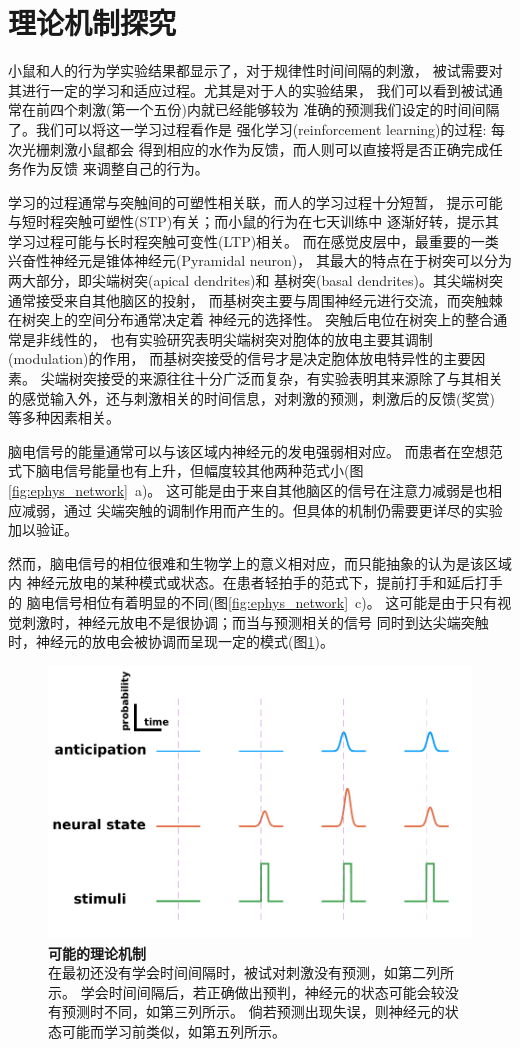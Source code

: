 \section{理论机制探究}

小鼠和人的行为学实验结果都显示了，对于规律性时间间隔的刺激，
被试需要对其进行一定的学习和适应过程。尤其是对于人的实验结果，
我们可以看到被试通常在前四个刺激(第一个五份)内就已经能够较为
准确的预测我们设定的时间间隔了。我们可以将这一学习过程看作是
强化学习(reinforcement learning)的过程: 每次光栅刺激小鼠都会
得到相应的水作为反馈，而人则可以直接将是否正确完成任务作为反馈
来调整自己的行为。

学习的过程通常与突触间的可塑性相关联，而人的学习过程十分短暂，
提示可能与短时程突触可塑性(STP)有关；而小鼠的行为在七天训练中
逐渐好转，提示其学习过程可能与长时程突触可变性(LTP)相关。
而在感觉皮层中，最重要的一类兴奋性神经元是锥体神经元(Pyramidal neuron)，
其最大的特点在于树突可以分为两大部分，即尖端树突(apical dendrites)和
基树突(basal dendrites)。其尖端树突通常接受来自其他脑区的投射，
而基树突主要与周围神经元进行交流，而突触棘在树突上的空间分布通常决定着
神经元的选择性\cite{mel2017synaptic}。
突触后电位在树突上的整合通常是非线性的，
也有实验研究表明尖端树突对胞体的放电主要其调制(modulation)的作用，
而基树突接受的信号才是决定胞体放电特异性的主要因素\cite{caze2017dendrites,branco2011synaptic}。
尖端树突接受的来源往往十分广泛而复杂，有实验表明其来源除了与其相关
的感觉输入外，还与刺激相关的时间信息，对刺激的预测，刺激后的反馈(奖赏)
等多种因素相关\cite{lacefield2019reinforcement}。

脑电信号的能量通常可以与该区域内神经元的发电强弱相对应。
而患者在空想范式下脑电信号能量也有上升，但幅度较其他两种范式小(图\ref{fig:ephys_network}~a)。
这可能是由于来自其他脑区的信号在注意力减弱是也相应减弱，通过
尖端突触的调制作用而产生的。但具体的机制仍需要更详尽的实验加以验证。

然而，脑电信号的相位很难和生物学上的意义相对应，而只能抽象的认为是该区域内
神经元放电的某种模式或状态。在患者轻拍手的范式下，提前打手和延后打手的
脑电信号相位有着明显的不同(图\ref{fig:ephys_network}~c)。
这可能是由于只有视觉刺激时，神经元放电不是很协调；而当与预测相关的信号
同时到达尖端突触时，神经元的放电会被协调而呈现一定的模式(图\ref{fig:theory})。

\begin{figure}[h]
    \centering
    \includegraphics[width=\textwidth]{src/figures/theory.pdf}
    \caption{\textbf{可能的理论机制}\\
    在最初还没有学会时间间隔时，被试对刺激没有预测，如第二列所示。
    学会时间间隔后，若正确做出预判，神经元的状态可能会较没有预测时不同，如第三列所示。
    倘若预测出现失误，则神经元的状态可能而学习前类似，如第五列所示。}
    \label{fig:theory}
\end{figure}


